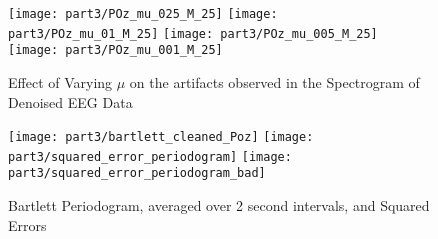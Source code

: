 \begin{figure}[H]
\centering{}
\texttt{[image: part3/POz\_mu\_025\_M\_25]}
\texttt{[image: part3/POz\_mu\_01\_M\_25]}
\texttt{[image: part3/POz\_mu\_005\_M\_25]}
\texttt{[image: part3/POz\_mu\_001\_M\_25]}
\caption{Effect of Varying $\mu$ on the artifacts observed in the Spectrogram of Denoised EEG Data}
\end{figure}


\begin{figure}[H]
\centering{}
\texttt{[image: part3/bartlett\_cleaned\_Poz]}
\texttt{[image: part3/squared\_error\_periodogram]}
\texttt{[image: part3/squared\_error\_periodogram\_bad]}
\caption{Bartlett Periodogram, averaged over 2 second intervals, and Squared Errors}
\end{figure}
